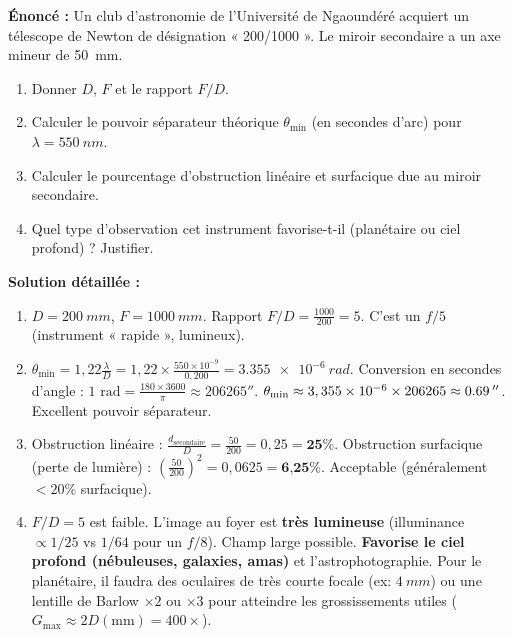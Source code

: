 \documentclass[11pt]{article}
\begin{document}
\begin{exoresolu}
\textbf{Énoncé :} Un club d'astronomie de l'Université de Ngaoundéré acquiert un télescope de Newton de désignation « 200/1000 ». Le miroir secondaire a un axe mineur de \SI{50}{mm}.
\begin{enumerate}
    \item Donner $D$, $F$ et le rapport $F/D$.
    \item Calculer le pouvoir séparateur théorique $\theta_{\text{min}}$ (en secondes d'arc) pour $\lambda = \SI{550}{nm}$.
    \item Calculer le pourcentage d'obstruction linéaire et surfacique due au miroir secondaire.
    \item Quel type d'observation cet instrument favorise-t-il (planétaire ou ciel profond) ? Justifier.
\end{enumerate}
\textbf{Solution détaillée :}
\begin{enumerate}
    \item $D = \SI{200}{mm}$, $F = \SI{1000}{mm}$. Rapport $F/D = \frac{1000}{200} = 5$. C'est un \textbf{$f/5$} (instrument « rapide », lumineux).
    \item $\theta_{\text{min}} = 1,22 \frac{\lambda}{D} = 1,22 \times \frac{550 \times 10^{-9}}{0,200} = \SI{3,355e-6}{rad}$.
    Conversion en secondes d'angle : $1 \text{ rad} = \frac{180 \times 3600}{\pi} \approx 206265''$.
    $\theta_{\text{min}} \approx 3,355 \times 10^{-6} \times 206265 \approx \textbf{\SI{0,69}{''}}$. Excellent pouvoir séparateur.
    \item Obstruction linéaire : $\frac{d_{\text{secondaire}}}{D} = \frac{50}{200} = 0,25 = \textbf{25\%}$.
    Obstruction surfacique (perte de lumière) : $\left(\frac{50}{200}\right)^2 = 0,0625 = \textbf{6,25\%}$. Acceptable (généralement $< 20\%$ surfacique).
    \item $F/D = 5$ est faible. L'image au foyer est \textbf{très lumineuse} (illuminance $\propto 1/25$ vs $1/64$ pour un $f/8$). Champ large possible. \textbf{Favorise le ciel profond (nébuleuses, galaxies, amas)} et l'astrophotographie. Pour le planétaire, il faudra des oculaires de très courte focale (ex: $\SI{4}{mm}$) ou une lentille de Barlow $\times 2$ ou $\times 3$ pour atteindre les grossissements utiles ($G_{\text{max}} \approx 2D(\text{mm}) = 400\times$).
\end{enumerate}
\end{exoresolu}
\end{document}
